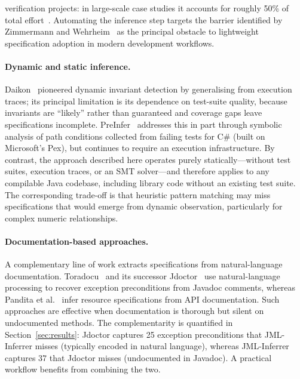 verification projects: in large-scale case studies it accounts for roughly 50\% of total effort~\cite{andronick_large-scale_2012, klein2014sel4, matichuk_cost_2015}. Automating the inference step targets the barrier identified by Zimmermann and Wehrheim~\cite{zimmermann2019lightweight} as the principal obstacle to lightweight specification adoption in modern development workflows.

\paragraph{Dynamic and static inference.}
Daikon~\cite{ernst2007daikon} pioneered dynamic invariant detection by generalising from execution traces; its principal limitation is its dependence on test-suite quality, because invariants are ``likely'' rather than guaranteed and coverage gaps leave specifications incomplete. PreInfer~\cite{preinfer2017} addresses this in part through symbolic analysis of path conditions collected from failing tests for C\# (built on Microsoft's Pex), but continues to require an execution infrastructure. By contrast, the approach described here operates purely statically---without test suites, execution traces, or an SMT solver---and therefore applies to any compilable Java codebase, including library code without an existing test suite. The corresponding trade-off is that heuristic pattern matching may miss specifications that would emerge from dynamic observation, particularly for complex numeric relationships.

\paragraph{Documentation-based approaches.}
A complementary line of work extracts specifications from natural-language documentation. Toradocu~\cite{toradocu2016} and its successor Jdoctor~\cite{jdoctor2018} use natural-language processing to recover exception preconditions from Javadoc comments, whereas Pandita et al.~\cite{pandita2012inferring} infer resource specifications from API documentation. Such approaches are effective when documentation is thorough but silent on undocumented methods. The complementarity is quantified in Section~\ref{sec:results}: Jdoctor captures 25 exception preconditions that JML-Inferrer misses (typically encoded in natural language), whereas JML-Inferrer captures 37 that Jdoctor misses (undocumented in Javadoc). A practical workflow benefits from combining the two.

